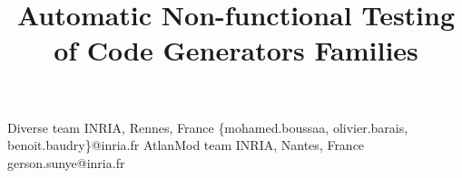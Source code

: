 \documentclass[preprint,10pt]{sigplanconf}
\begin{document}
 

\title{Automatic Non-functional Testing of Code Generators Families}
 

           {Diverse team INRIA, Rennes, France}
           { \{mohamed.boussaa, olivier.barais, benoit.baudry\}@inria.fr}
           {AtlanMod team INRIA, Nantes, France}
           {gerson.sunye@inria.fr}


\maketitle

\newcommand{\etal}{et al.}
\newcommand{\eg}[0]{e.\,g.}
\newcommand{\ie}[0]{i.\,e.}



\vfill




%






 

 
 








 

 
\end{document}
